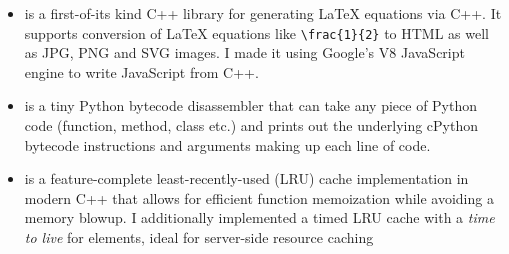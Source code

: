 \begin{itemize}
  \item {} is a first-of-its kind C++ library for generating LaTeX equations via C++. It supports conversion of LaTeX equations like \texttt{\textbackslash frac\{1\}\{2\}} to HTML as well as JPG, PNG and SVG images. I made it using Google's V8 JavaScript engine to write JavaScript from C++.
  \item {} is a tiny Python bytecode disassembler that can take any piece of Python code (function, method, class etc.) and prints out the underlying cPython bytecode instructions and arguments making up each line of code.
  \item {} is a feature-complete least-recently-used (LRU) cache implementation in modern C++ that allows for efficient function memoization while avoiding a memory blowup. I additionally implemented a timed LRU cache with a \emph{time to live} for elements, ideal for server-side resource caching
\end{itemize}

